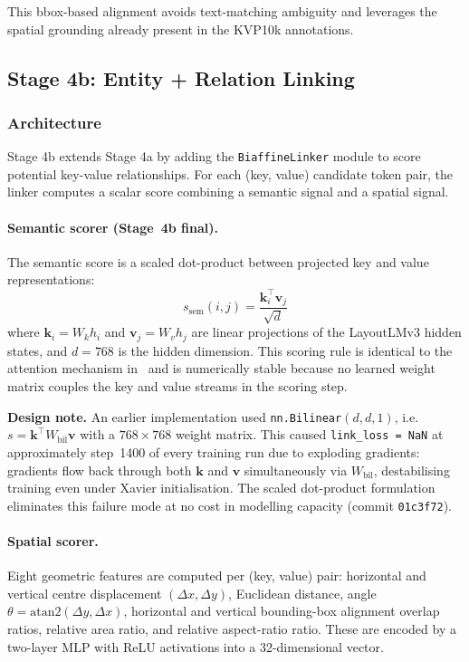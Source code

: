This bbox-based alignment avoids text-matching ambiguity and leverages the spatial grounding already present in the KVP10k annotations.

\subsection{Stage 4b: Entity + Relation Linking}
\label{sec:stage4b_entity_relation}

\subsubsection{Architecture}
\label{sec:linker_module}

Stage 4b extends Stage 4a by adding the \texttt{BiaffineLinker} module to score potential key-value relationships. For each (key, value) candidate token pair, the linker computes a scalar score combining a semantic signal and a spatial signal.

\paragraph{Semantic scorer (Stage~4b final).}
The semantic score is a scaled dot-product between projected key and value representations:
\[
    s_{\text{sem}}(i,j) = \frac{\mathbf{k}_i^\top \mathbf{v}_j}{\sqrt{d}}
\]
where $\mathbf{k}_i = W_k h_i$ and $\mathbf{v}_j = W_v h_j$ are linear projections of the LayoutLMv3 hidden states, and $d = 768$ is the hidden dimension. This scoring rule is identical to the attention mechanism in~\cite{vaswani2017attention} and is numerically stable because no learned weight matrix couples the key and value streams in the scoring step.

\textbf{Design note.}
An earlier implementation used \texttt{nn.Bilinear}$(d, d, 1)$, i.e.\ $s = \mathbf{k}^\top W_{\text{bil}} \mathbf{v}$ with a $768 \times 768$ weight matrix. This caused \texttt{link\_loss~=~NaN} at approximately step~1400 of every training run due to exploding gradients: gradients flow back through both $\mathbf{k}$ and $\mathbf{v}$ simultaneously via $W_{\text{bil}}$, destabilising training even under Xavier initialisation. The scaled dot-product formulation eliminates this failure mode at no cost in modelling capacity (commit \texttt{01c3f72}).

\paragraph{Spatial scorer.}
Eight geometric features are computed per (key, value) pair: horizontal and vertical centre displacement $(\Delta x, \Delta y)$, Euclidean distance, angle $\theta = \text{atan2}(\Delta y, \Delta x)$, horizontal and vertical bounding-box alignment overlap ratios, relative area ratio, and relative aspect-ratio ratio. These are encoded by a two-layer MLP with ReLU activations into a 32-dimensional vector.

